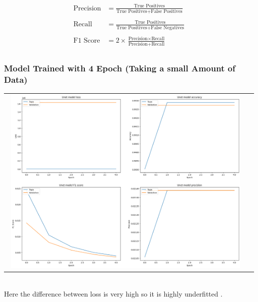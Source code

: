 \documentclass[12pt,a4paper]{report}
\begin{document}
	\begin{align*}
    \text{Precision} &= \frac{\text{True Positives}}{\text{True Positives} + \text{False Positives}} \\ \\
    \text{Recall} &= \frac{\text{True Positives}}{\text{True Positives} + \text{False Negatives}} \\ \\
    \text{F1 Score} &= 2 \times \frac{\text{Precision} \times \text{Recall}}{\text{Precision} + \text{Recall}} \\
\end{align*}

\subsubsection{Model Trained with 4 Epoch (Taking a small Amount of Data) }
		    \begin{tabular}{c c}
 \includegraphics[width=0.97\textwidth]{4epoch}
    \end{tabular}
    \\
Here the difference between loss is very high so it is highly underfitted .
\end{document}
